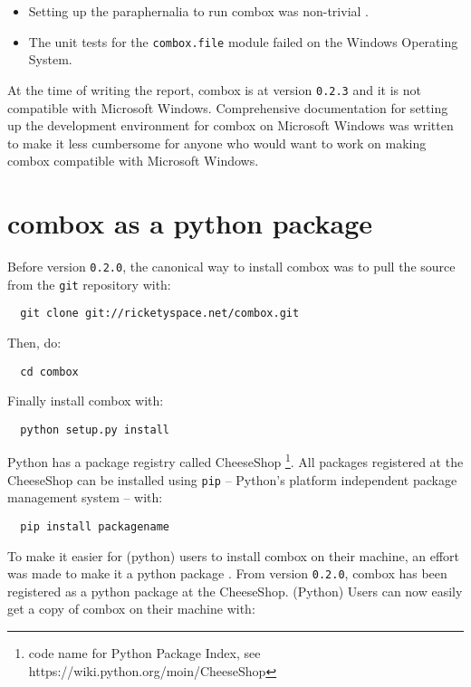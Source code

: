\begin{itemize}
\item Setting up the paraphernalia to run combox was non-trivial
  \cite{doc:combox-setup-windoze}.
\item The unit tests for the \verb+combox.file+ module failed on the
  Windows Operating System.
\end{itemize}

At the time of writing the report, combox is at version \verb+0.2.3+
and it is not compatible with Microsoft Windows. Comprehensive
documentation for setting up the development environment for combox on
Microsoft Windows was written \cite{doc:combox-setup-windoze} to make
it less cumbersome for anyone who would want to work on making combox
compatible with Microsoft Windows.

\section{combox as a python package}\label{3-pypi}

Before version \verb+0.2.0+, the canonical way to install combox was
to pull the source from the \verb+git+ repository with:

\begin{verbatim}
  git clone git://ricketyspace.net/combox.git
\end{verbatim}

Then, do:

\begin{verbatim}
  cd combox
\end{verbatim}

Finally install combox with:

\begin{verbatim}
  python setup.py install
\end{verbatim}

Python has a package registry called CheeseShop \footnote{code name
  for Python Package Index, see
  https://wiki.python.org/moin/CheeseShop}.  All packages registered
at the CheeseShop can be installed using \verb+pip+ -- Python's
platform independent package management system \cite{py:pip} -- with:

\begin{verbatim}
  pip install packagename
\end{verbatim}

To make it easier for (python) users to install combox on their
machine, an effort was made to make it a python package
\cite{py:package-guide}. From version \verb+0.2.0+, combox has been
registered as a python package at the CheeseShop. (Python) Users can
now easily get a copy of combox on their machine with:

